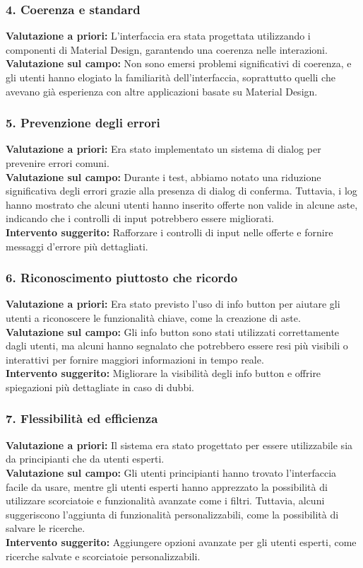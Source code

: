 \subsubsection*{4. Coerenza e standard}
\textbf{Valutazione a priori:} L'interfaccia era stata progettata utilizzando i componenti di Material Design, garantendo una coerenza nelle interazioni.\\
\textbf{Valutazione sul campo:} Non sono emersi problemi significativi di coerenza, e gli utenti hanno elogiato la familiarità dell'interfaccia, soprattutto quelli che avevano già esperienza con altre applicazioni basate su Material Design.

\subsubsection*{5. Prevenzione degli errori}
\textbf{Valutazione a priori:} Era stato implementato un sistema di dialog per prevenire errori comuni.\\
\textbf{Valutazione sul campo:} Durante i test, abbiamo notato una riduzione significativa degli errori grazie alla presenza di dialog di conferma. Tuttavia, i log hanno mostrato che alcuni utenti hanno inserito offerte non valide in alcune aste, indicando che i controlli di input potrebbero essere migliorati.\\
\textbf{Intervento suggerito:} Rafforzare i controlli di input nelle offerte e fornire messaggi d’errore più dettagliati.

\subsubsection*{6. Riconoscimento piuttosto che ricordo}
\textbf{Valutazione a priori:} Era stato previsto l'uso di info button per aiutare gli utenti a riconoscere le funzionalità chiave, come la creazione di aste.\\
\textbf{Valutazione sul campo:} Gli info button sono stati utilizzati correttamente dagli utenti, ma alcuni hanno segnalato che potrebbero essere resi più visibili o interattivi per fornire maggiori informazioni in tempo reale.\\
\textbf{Intervento suggerito:} Migliorare la visibilità degli info button e offrire spiegazioni più dettagliate in caso di dubbi.

\subsubsection*{7. Flessibilità ed efficienza}
\textbf{Valutazione a priori:} Il sistema era stato progettato per essere utilizzabile sia da principianti che da utenti esperti.\\
\textbf{Valutazione sul campo:} Gli utenti principianti hanno trovato l'interfaccia facile da usare, mentre gli utenti esperti hanno apprezzato la possibilità di utilizzare scorciatoie e funzionalità avanzate come i filtri. Tuttavia, alcuni suggeriscono l'aggiunta di funzionalità personalizzabili, come la possibilità di salvare le ricerche.\\
\textbf{Intervento suggerito:} Aggiungere opzioni avanzate per gli utenti esperti, come ricerche salvate e scorciatoie personalizzabili.

